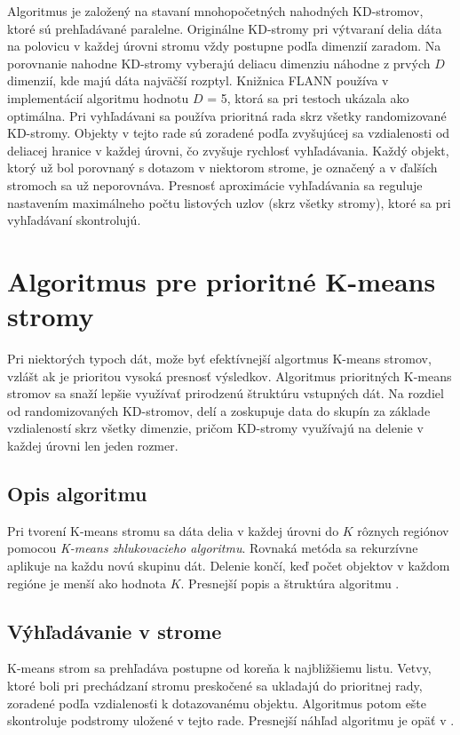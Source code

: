 \documentclass[12pt,oneside]{fithesis2}
\begin{document}
	Algoritmus je založený na stavaní mnohopočetných nahodných KD-stromov, ktoré sú prehľadávané paralelne. Originálne KD-stromy pri výtvaraní delia dáta na polovicu v každej úrovni stromu vždy postupne podľa dimenzií zaradom. Na porovnanie nahodne KD-stromy vyberajú deliacu dimenziu náhodne z prvých $D$ dimenzií, kde majú dáta najväčší rozptyl. Knižnica FLANN používa v implementácií algoritmu hodnotu $D$ = 5, ktorá sa pri testoch ukázala ako optimálna. Pri vyhľadávani sa používa prioritná rada skrz všetky randomizované KD-stromy. Objekty v tejto rade sú zoradené podľa zvyšujúcej sa vzdialenosti od deliacej hranice v každej úrovni, čo zvyšuje rychlosť vyhľadávania. Každý objekt, ktorý už bol porovnaný s dotazom v niektorom strome, je označený a v ďalších  stromoch sa už neporovnáva. Presnosť aproximácie vyhľadávania sa reguluje nastavením maximálneho počtu listových uzlov (skrz všetky stromy), ktoré sa pri vyhľadávaní skontrolujú. \cite{flann_pami_2014} 	
	
	\section{Algoritmus pre prioritné K-means stromy}
	Pri niektorých typoch dát, može byť efektívnejší algortmus K-means stromov, vzlášt ak je prioritou vysoká presnosť výsledkov. Algoritmus prioritných K-means stromov sa snaží lepšie využívať prirodzenú štruktúru vstupných dát. Na rozdiel od randomizovaných KD-stromov, delí a zoskupuje data do skupín za základe vzdialeností skrz všetky dimenzie, pričom KD-stromy využívajú na delenie v každej úrovni len jeden rozmer. \cite{flann_pami_2014}
	\subsection{Opis algoritmu}
	Pri tvorení K-means stromu sa dáta delia v každej úrovni do $K$ rôznych regiónov pomocou \textit{K-means zhlukovacieho algoritmu}. Rovnaká metóda sa rekurzívne aplikuje na každu novú skupinu dát. Delenie končí, keď počet objektov v každom regióne je menší ako hodnota $K$. Presnejší popis a štruktúra algoritmu \cite{flann_pami_2014}.
	\subsection{Výhľadávanie v strome}
	K-means strom sa prehľadáva postupne od koreňa k najbližšiemu listu. Vetvy, ktoré boli pri prechádzaní stromu preskočené sa ukladajú do prioritnej rady, zoradené podľa vzdialenosťi k dotazovanému objektu. Algoritmus potom ešte skontroluje podstromy uložené v tejto rade. Presnejší náhľad algoritmu je opäť v \cite{flann_pami_2014}.
	
\end{document}
